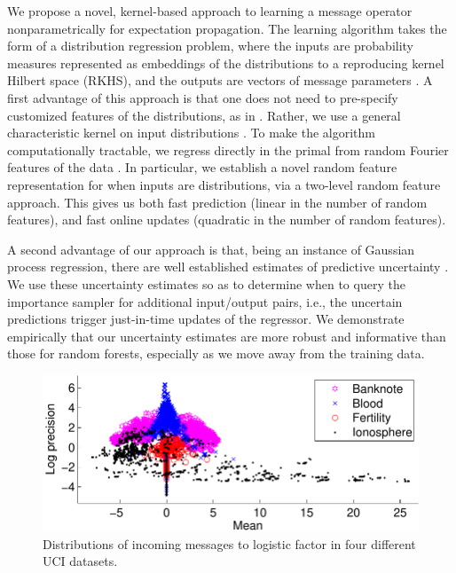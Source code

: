 \documentclass[english]{article}
\theoremstyle{plain}
\theoremstyle{plain}
\newcommand{\wjnote}[1]{ }
\newcommand{\aenote}[1]{}
\begin{document}
We propose a novel, kernel-based approach to learning a message operator nonparametrically
for expectation propagation. The learning algorithm takes the form of a distribution regression
problem, where the inputs are probability measures represented as embeddings
of the distributions to a reproducing kernel Hilbert space (RKHS), and the outputs are vectors of message
parameters \citep{Szabo2014}. 
A first advantage of this approach is that one does not need to pre-specify customized features
of the distributions, as in \citep{Eslami2014,Heess2013}. Rather, 
we use a general characteristic kernel on input distributions 
\citep[eq. 9]{Christmann2010}.
%
%
To make the algorithm computationally tractable, 
we regress  directly in the primal from random Fourier features of the data \citep{Rahimi2007,Le2013,YanSmoZonWil14}.
In particular, we establish a novel random feature representation for when
 inputs are distributions, via a  two-level random feature approach.
This gives us both fast prediction (linear in the number of
random features), and fast online updates (quadratic in the number of random features).

A second advantage of our approach is that, being an instance of Gaussian process
regression, there are well established estimates of predictive uncertainty \citep[Ch. 2]{RasWil06}.
We use these uncertainty estimates so as to determine when to query the importance sampler
for additional input/output pairs, i.e., the uncertain predictions trigger just-in-time updates
of the regressor. We demonstrate empirically that our uncertainty estimates are 
more robust and informative
than those for random forests, especially as we move away from the training data.

\begin{figure}[t]
\centering
\includegraphics[width=0.9\columnwidth]{img/online/uci_in_msgs-crop}
\caption{Distributions of incoming messages to logistic factor in four different UCI datasets. 
\label{fig:uci_in_msgs}
}
\end{figure}
\end{document}
